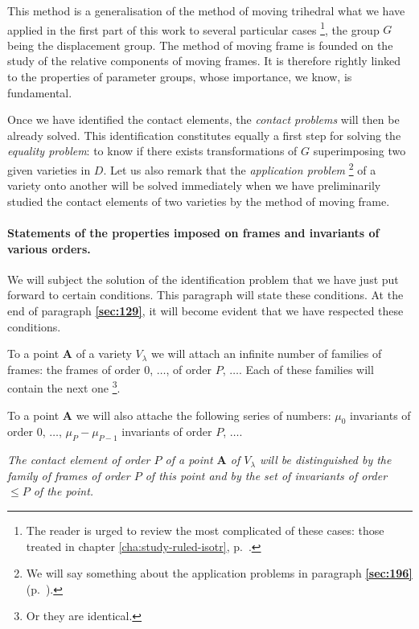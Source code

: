 \documentclass[leqno,11pt]{book}
\numberwithin{equation}{chapter}
\theoremstyle{shape1}
\theoremstyle{shapesmall}
\newcommand{\fsref}[1]{{\rm\textsection\textbf{\ref{sec:#1}}}}
\newcommand{\somespace}{\vspace{9pt}}
\begin{document}
This method is a generalisation of the method of moving trihedral what we have applied in the first part of this work to several particular cases \footnote{The reader is urged to review the most complicated of these cases: those treated in chapter \ref{cha:study-ruled-isotr}, p.~\pageref{cha:study-ruled-isotr}.}, the group $G$ being the displacement group. The method of moving frame is founded on the study of the relative components of moving frames. It is therefore rightly linked to the properties of parameter groups, whose importance, we know, is fundamental.

Once we have identified the contact elements, the \emph{contact problems} will then be already solved. This identification constitutes equally a first step for solving the \emph{equality problem}: to know if there exists transformations of $G$ superimposing two given varieties in $D$. Let us also remark that the \emph{application problem} \footnote{We will say something about the application problems in paragraph \fsref{196} (p.~\pageref{sec:196}).} of a variety onto another will be solved immediately when we have preliminarily studied the contact elements of two varieties by the method of moving frame.

\paragraph{Statements of the properties imposed on frames and invariants of various orders.}
\label{sec:127}
We will subject the solution of the identification problem that we have just put forward to certain conditions. This paragraph will state these conditions. At the end of paragraph \fsref{129}, it will become evident that we have respected these conditions.

To a point $\mathbf{A}$ of a variety $V_{\lambda}$ we will attach an infinite number of families of frames: the frames of order $0$, $\dots$, of order $P$, $\dots$. Each of these families will contain the next one \footnote{Or they are identical.}.

To a point $\mathbf{A}$ we will also attache the following series of numbers: $\mu_{0}$ invariants of order $0$, $\dots$, $\mu_{P}-\mu_{P-1}$ invariants of order $P$, $\dots$.

\somespace

\emph{The contact element of order $P$ of a point $\mathbf{A}$ of $V_{\lambda}$ will be distinguished by the family of frames of order $P$ of this point and by the set of invariants of order $\le P$ of the point.}
\end{document}
